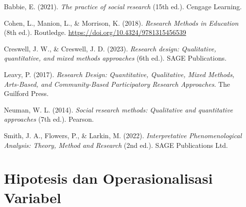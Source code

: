 \documentclass[
  indonesian,
  letterpaper,
  DIV=11,
  numbers=noendperiod]{scrreprt}
\newlength{\cslhangindent}
\newenvironment{CSLReferences}[2] %
 {\begin{list}{}{%
  \setlength{\itemindent}{0pt}
  \setlength{\leftmargin}{0pt}
  \setlength{\parsep}{0pt}
  \ifodd #1
   \setlength{\leftmargin}{\cslhangindent}
   \setlength{\itemindent}{-1\cslhangindent}
  \fi
  \setlength{\itemsep}{#2\baselineskip}}}
 {\end{list}}
\begin{document}
\label{refs--9}
\begin{CSLReferences}{1}{0}
Babbie, E. (2021). \emph{The practice of social research} (15th ed.).
Cengage Learning.

Cohen, L., Manion, L., \& Morrison, K. (2018). \emph{Research Methods in
Education} (8th ed.). Routledge.
\url{https://doi.org/10.4324/9781315456539}

Creswell, J. W., \& Creswell, J. D. (2023). \emph{Research design:
Qualitative, quantitative, and mixed methods approaches} (6th ed.). SAGE
Publications.

Leavy, P. (2017). \emph{Research Design: Quantitative, Qualitative,
Mixed Methods, Arts-Based, and Community-Based Participatory Research
Approaches}. The Guilford Press.

Neuman, W. L. (2014). \emph{Social research methods: Qualitative and
quantitative approaches} (7th ed.). Pearson.

Smith, J. A., Flowers, P., \& Larkin, M. (2022). \emph{Interpretative
Phenomenological Analysis: Theory, Method and Research} (2nd ed.). SAGE
Publications Ltd.

\end{CSLReferences}

\chapter{Hipotesis dan Operasionalisasi
Variabel}\label{hipotesis-dan-operasionalisasi-variabel}
\end{document}
